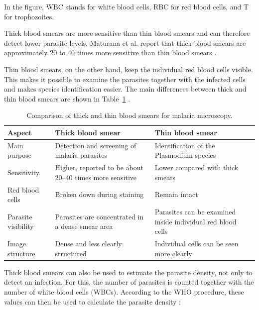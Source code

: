 \FloatBarrier

In the figure, WBC stands for white blood cells, RBC for red blood cells, and T for trophozoites.

Thick blood smears are more sensitive than thin blood smears and can therefore detect lower parasite levels. Maturana et al. report that thick blood smears are approximately 20 to 40 times more sensitive than thin blood smears \cite{Maturana2022}.

Thin blood smears, on the other hand, keep the individual red blood cells visible. This makes it possible to examine the parasites together with the infected cells and makes species identification easier. The main differences between thick and thin blood smears are shown in Table~\ref{tab:thick_thin_comparison} \cite{Maturana2022}.

\begin{table}[htbp]
    \centering
    \caption{Comparison of thick and thin blood smears for malaria microscopy.}
    \label{tab:thick_thin_comparison}
    \begin{tabularx}{\textwidth}{|p{3.2cm}|X|X|}
        \hline
        \textbf{Aspect} & \textbf{Thick blood smear} & \textbf{Thin blood smear} \\
        \hline
        Main purpose &
        Detection and screening of malaria parasites &
        Identification of the Plasmodium species \\
        \hline
        Sensitivity &
        Higher, reported to be about 20--40 times more sensitive &
        Lower compared with thick smears \\
        \hline
        Red blood cells &
        Broken down during staining &
        Remain intact \\
        \hline
        Parasite visibility &
        Parasites are concentrated in a dense smear area &
        Parasites can be examined inside individual red blood cells \\
        \hline
        Image structure &
        Dense and less clearly structured &
        Individual cells can be seen more clearly \\
        \hline
    \end{tabularx}
\end{table}

\FloatBarrier

Thick blood smears can also be used to estimate the parasite density, not only to detect an infection. For this, the number of parasites is counted together with the number of white blood cells (WBCs). According to the WHO procedure, these values can then be used to calculate the parasite density \cite{WHO2016ParasiteCounting}:

